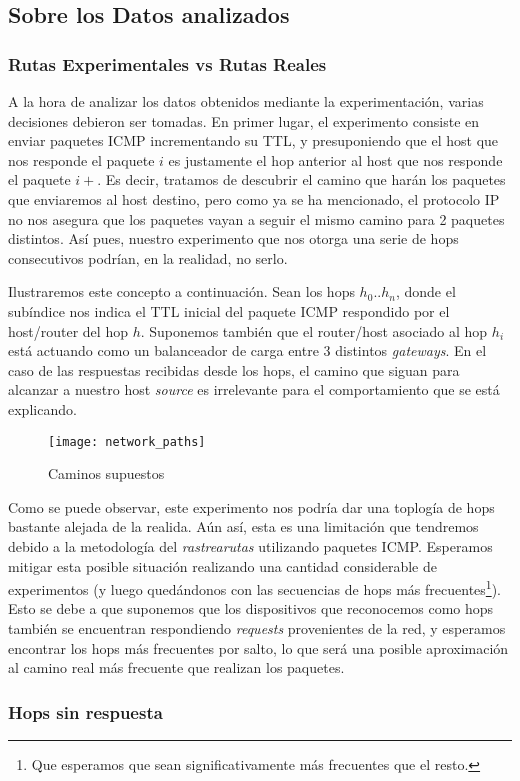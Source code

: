 \subsection*{Sobre los Datos analizados}\label{sec:datos_analizados}
\subsubsection*{Rutas Experimentales vs Rutas Reales}
\par A la hora de analizar los datos obtenidos mediante la experimentaci\'on,
varias decisiones debieron ser tomadas. En primer lugar, el experimento consiste en
enviar paquetes ICMP incrementando su TTL, y presuponiendo que el host que
nos responde el paquete $i$ es justamente el hop anterior al host que nos
responde el paquete $i+$. Es decir, tratamos de descubrir el camino
que har\'an los paquetes que enviaremos al host destino, pero como ya
se ha mencionado, el protocolo IP no nos asegura que los paquetes vayan
a seguir el mismo camino para 2 paquetes distintos. As\'i pues, nuestro
experimento que nos otorga una serie de hops consecutivos podr\'ian, en la
realidad, no serlo.

\par Ilustraremos este concepto a continuaci\'on. Sean los hops $h_0..h_n$,
donde el sub\'indice nos indica el TTL inicial del paquete ICMP respondido por
el host/router del hop $h$. Suponemos tambi\'en que el router/host asociado al hop
$h_i$ est\'a actuando como un balanceador de carga entre 3 distintos
\textit{gateways}. En el caso de las respuestas recibidas desde los hops, el
camino que siguan para alcanzar a nuestro host \textit{source} es irrelevante
para el comportamiento que se est\'a explicando.

\begin{figure}[h]
    \centering
    \texttt{[image: network\_paths]}
    \caption{Caminos supuestos}
    \label{fig:network_paths}
\end{figure}

\par Como se puede observar, este experimento nos podr\'ia dar una toplog\'ia
de hops bastante alejada de la realida. A\'un as\'i, esta es una limitaci\'on
que tendremos debido a la metodolog\'ia del \textit{rastrearutas} utilizando
paquetes ICMP. Esperamos mitigar esta posible situaci\'on realizando una
cantidad considerable de experimentos (y luego qued\'andonos con
las secuencias de hops m\'as frecuentes\footnote{Que esperamos que sean
significativamente m\'as frecuentes que el resto.}). Esto se debe a que suponemos
que los dispositivos que reconocemos como hops tambi\'en se encuentran
respondiendo \textit{requests} provenientes de la red, y esperamos encontrar
los hops m\'as frecuentes por salto, lo que ser\'a una posible aproximaci\'on
al camino real m\'as frecuente que realizan los paquetes.

\subsubsection*{Hops sin respuesta}

